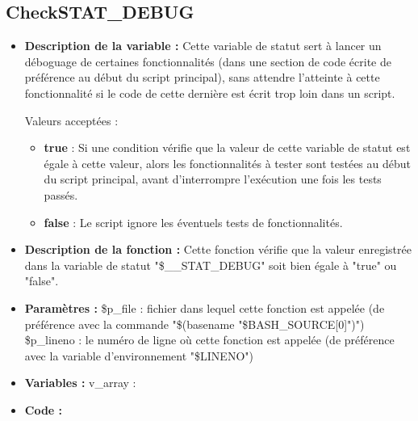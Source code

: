 \documentclass[a4paper,10pt]{article}
\begin{document}
\subsection{CheckSTAT\_DEBUG}
\begin{itemize}
    \item \textbf{Description de la variable :} Cette variable de statut sert à lancer un déboguage de certaines fonctionnalités (dans une section de code écrite de préférence au début du script principal), sans attendre l'atteinte à cette fonctionnalité si le code de cette dernière est écrit trop loin dans un script.
    
    Valeurs acceptées :
    \begin{itemize}
        \item \textbf{true} : Si une condition vérifie que la valeur de cette variable de statut est égale à cette valeur, alors les fonctionnalités à tester sont testées au début du script principal, avant d'interrompre l'exécution une fois les tests passés.
        \item \textbf{false} : Le script ignore les éventuels tests de fonctionnalités. 
    \end{itemize}

    \item \textbf{Description de la fonction :} Cette fonction vérifie que la valeur enregistrée dans la variable de statut "\$\_\_STAT\_DEBUG" soit bien égale à "true" ou "false".

    \item \textbf{Paramètres :} \$p\_file : fichier dans lequel cette fonction est appelée (de préférence avec la commande "\$(basename "\$BASH\_SOURCE[0]")")
    \$p\_lineno : le numéro de ligne où cette fonction est appelée (de préférence avec la variable d'environnement "\$LINENO")

    \item \textbf{Variables :} v\_array :

    \item \textbf{Code :}
\end{itemize}
\end{document}
